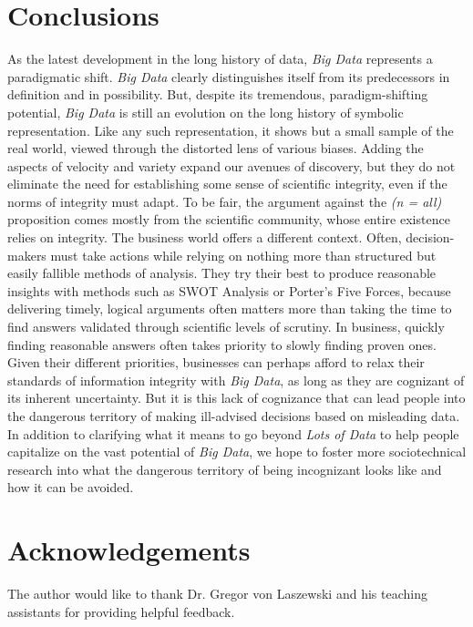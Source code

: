 \documentclass[sigconf]{acmart}
\begin{document}
\section{Conclusions}
As the latest development in the long history of data, {\em Big Data} represents a paradigmatic shift. {\em Big Data} clearly distinguishes itself from its predecessors in definition and in possibility. But, despite its tremendous, paradigm-shifting potential, {\em Big Data} is still an evolution on the long history of symbolic representation. Like any such representation, it shows but a small sample of the real world, viewed through the distorted lens of various biases. Adding the aspects of velocity and variety expand our avenues of discovery, but they do not eliminate the need for establishing some sense of scientific integrity, even if the norms of integrity must adapt. To be fair, the argument against the {\em (n = all)} proposition comes mostly from the scientific community, whose entire existence relies on integrity. The business world offers a different context. Often, decision-makers must take actions while relying on nothing more than structured but easily fallible methods of analysis. They try their best to produce reasonable insights with methods such as SWOT Analysis or Porter's Five Forces, because delivering timely, logical arguments often matters more than taking the time to find answers validated through scientific levels of scrutiny. In business, quickly finding reasonable answers often takes priority to slowly finding proven ones. Given their different priorities, businesses can perhaps afford to relax their standards of information integrity with {\em Big Data}, as long as they are cognizant of its inherent uncertainty. But it is this lack of cognizance that can lead people into the dangerous territory of making ill-advised decisions based on misleading data. In addition to clarifying what it means to go beyond {\em Lots of Data} to help people capitalize on the vast potential of {\em Big Data}, we hope to foster more sociotechnical research into what the dangerous territory of being incognizant looks like and how it can be avoided.

\section{Acknowledgements}
The author would like to thank Dr. Gregor von Laszewski and his teaching assistants for providing helpful feedback.





 
\end{document}
